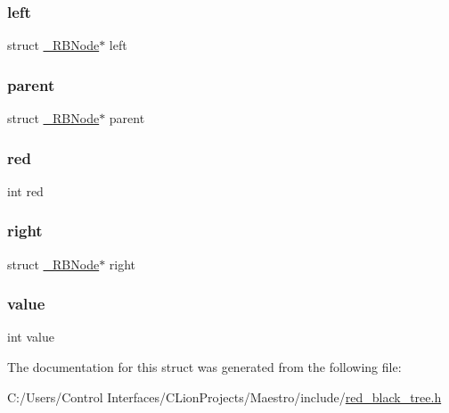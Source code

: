 \subsubsection{\texorpdfstring{left}{left}}
{\footnotesize\ttfamily struct \hyperlink{struct___r_b_node}{\+\_\+\+R\+B\+Node}$\ast$ left}

\mbox{\label{struct___r_b_node_a9788bfc94d2d8984d7e40d8a22305b74}} 
\subsubsection{\texorpdfstring{parent}{parent}}
{\footnotesize\ttfamily struct \hyperlink{struct___r_b_node}{\+\_\+\+R\+B\+Node}$\ast$ parent}

\mbox{\label{struct___r_b_node_a6761340706096510fd89edca40a63b9b}} 
\subsubsection{\texorpdfstring{red}{red}}
{\footnotesize\ttfamily int red}

\mbox{\label{struct___r_b_node_ad44dabcb80eb4e2671365ebc9d6b2798}} 
\subsubsection{\texorpdfstring{right}{right}}
{\footnotesize\ttfamily struct \hyperlink{struct___r_b_node}{\+\_\+\+R\+B\+Node}$\ast$ right}

\mbox{\label{struct___r_b_node_ac4f474c82e82cbb89ca7c36dd52be0ed}} 
\subsubsection{\texorpdfstring{value}{value}}
{\footnotesize\ttfamily int value}



The documentation for this struct was generated from the following file\+:\begin{DoxyCompactItemize}
\item 
C\+:/\+Users/\+Control Interfaces/\+C\+Lion\+Projects/\+Maestro/include/\hyperlink{red__black__tree_8h}{red\+\_\+black\+\_\+tree.\+h}\end{DoxyCompactItemize}
